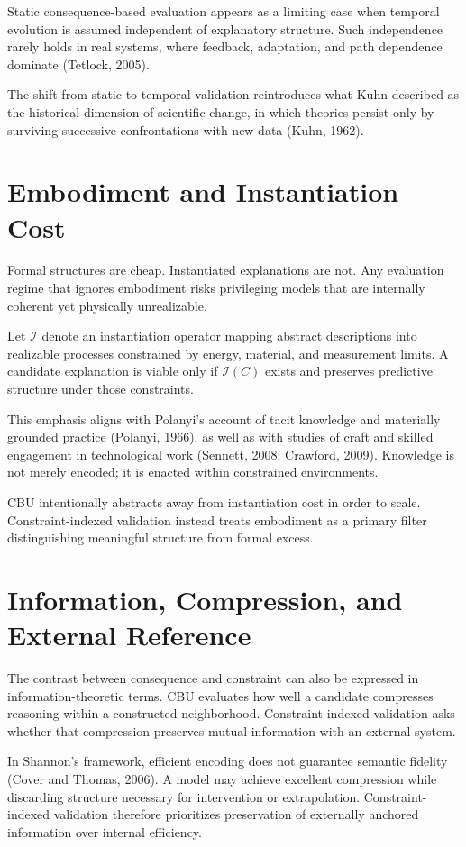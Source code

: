 \documentclass[11pt]{article}
\begin{document}
Static consequence-based evaluation appears as a limiting case when temporal evolution is assumed independent of explanatory structure. Such independence rarely holds in real systems, where feedback, adaptation, and path dependence dominate (Tetlock, 2005).

The shift from static to temporal validation reintroduces what Kuhn described as the historical dimension of scientific change, in which theories persist only by surviving successive confrontations with new data (Kuhn, 1962).

\section{Embodiment and Instantiation Cost}

Formal structures are cheap. Instantiated explanations are not. Any evaluation regime that ignores embodiment risks privileging models that are internally coherent yet physically unrealizable.

Let \(\mathcal{I}\) denote an instantiation operator mapping abstract descriptions into realizable processes constrained by energy, material, and measurement limits. A candidate explanation is viable only if \(\mathcal{I}(C)\) exists and preserves predictive structure under those constraints.

This emphasis aligns with Polanyi's account of tacit knowledge and materially grounded practice (Polanyi, 1966), as well as with studies of craft and skilled engagement in technological work (Sennett, 2008; Crawford, 2009). Knowledge is not merely encoded; it is enacted within constrained environments.

CBU intentionally abstracts away from instantiation cost in order to scale. Constraint-indexed validation instead treats embodiment as a primary filter distinguishing meaningful structure from formal excess.

\section{Information, Compression, and External Reference}

The contrast between consequence and constraint can also be expressed in information-theoretic terms. CBU evaluates how well a candidate compresses reasoning within a constructed neighborhood. Constraint-indexed validation asks whether that compression preserves mutual information with an external system.

In Shannon's framework, efficient encoding does not guarantee semantic fidelity (Cover and Thomas, 2006). A model may achieve excellent compression while discarding structure necessary for intervention or extrapolation. Constraint-indexed validation therefore prioritizes preservation of externally anchored information over internal efficiency.
\end{document}
